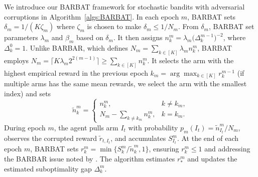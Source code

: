 
We introduce our BARBAT framework for stochastic bandits with adversarial corruptions in Algorithm~\ref{algs:BARBAT}. In each epoch $m$, BARBAT sets
$\delta_m = 1/(K \zeta_m)$ where $\zeta_m$ is chosen to make $\delta_m \le 1/N_m$. From $\delta_m$, BARBAT set parameters  
 $\lambda_m$ and $\beta_m$ based on $\delta_m$. It then assigns
$n_k^m = \lambda_m \bigl(\Delta_k^{m-1}\bigr)^{-2}$, where $\Delta_k^0 = 1$.
Unlike BARBAR, which defines $N_m=\sum_{k \in [K]}\lambda_m n_k^m$, BARBAT employs
$N_m=\bigl\lceil K\lambda_m 2^{2(m-1)}\bigr\rceil \ge \sum_{k \in [K]}n_k^m.$
It selects the arm with the highest empirical reward in the previous epoch $k_m=\arg\max_{k\in[K]}r_k^{m-1}$ (if multiple arms has the same mean rewards, we select the arm with the smallest index)
and sets
\[
\widetilde{n}_k^m =
\begin{cases}
n_k^m, & k \neq k_m, \\
N_m - \sum_{k \neq k_m} n_k^m, & k = k_m.
\end{cases}
\]
During epoch $m$, the agent pulls arm $I_t$ with probability $p_m(I_t)=\widetilde{n}_{I_t}^m/N_m$, observes the corrupted reward $\widetilde{r}_{t,I_t}$, and accumulates $S_{I_t}^m$. At the end of each epoch $m$, BARBAT sets
$r_k^m=\min\{S_k^m/\widetilde{n}_k^m,1\}$, ensuring $r_k^m \le 1$ and addressing the BARBAR issue noted by \citet{lu2021stochastic}. The algorithm estimates $r_*^m$
and updates the estimated suboptimality gap $\Delta_k^m$.


